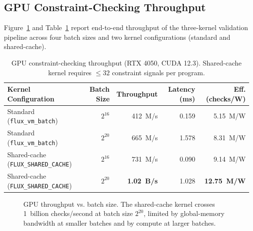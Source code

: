 \documentclass[conference]{IEEEtran}
\begin{document}
\subsection{GPU Constraint-Checking Throughput}
\label{sec:eval-gpu}

Figure~\ref{fig:gpu-throughput} and Table~\ref{tab:gpu-throughput} report
end-to-end throughput of the three-kernel validation pipeline across four
batch sizes and two kernel configurations (standard and shared-cache).

\begin{table}[t]
\centering
\caption{GPU constraint-checking throughput (RTX 4050, CUDA 12.3).
Shared-cache kernel requires $\le 32$ constraint signals per program.}
\label{tab:gpu-throughput}
\renewcommand{\arraystretch}{1.15}
\begin{tabular}{lrrrr}
\toprule
\textbf{Kernel Configuration} & \textbf{Batch Size} & \textbf{Throughput} &
\textbf{Latency (ms)} & \textbf{Eff. (checks/W)} \\
\midrule
Standard (\texttt{flux\_vm\_batch})       & $2^{16}$  & 412~M/s  & 0.159 & 5.15~M/W \\
Standard (\texttt{flux\_vm\_batch})       & $2^{20}$  & 665~M/s  & 1.578 & 8.31~M/W \\
Shared-cache (\texttt{FLUX\_SHARED\_CACHE}) & $2^{16}$ & 731~M/s  & 0.090 & 9.14~M/W \\
Shared-cache (\texttt{FLUX\_SHARED\_CACHE}) & $2^{20}$ & \textbf{1.02~B/s} & 1.028 & \textbf{12.75~M/W} \\
\bottomrule
\end{tabular}
\end{table}

\begin{figure}[t]
\centering
{}
\caption{GPU throughput vs. batch size. The shared-cache kernel crosses
1~billion checks/second at batch size $2^{20}$, limited by global-memory
bandwidth at smaller batches and by compute at larger batches.}
\label{fig:gpu-throughput}
\end{figure}
\end{document}
